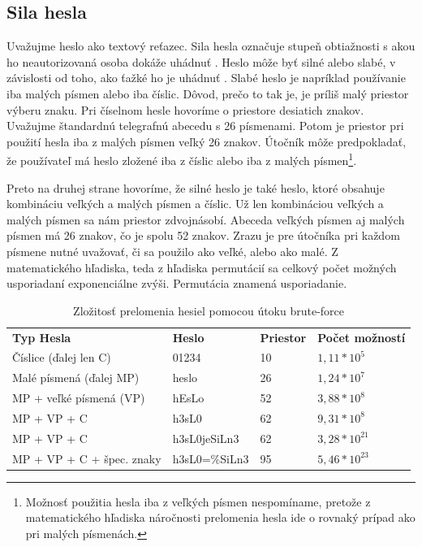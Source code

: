 \subsection{Sila hesla} 
Uvažujme heslo ako textový reťazec. Sila hesla označuje stupeň obtiažnosti s akou ho neautorizovaná osoba dokáže uhádnuť \cite{4}. Heslo môže byť silné alebo slabé, v závislosti od toho, ako ťažké ho je uhádnuť \cite{4}. Slabé heslo je napríklad používanie iba malých písmen alebo iba číslic. Dôvod, prečo to tak je, je príliš malý priestor výberu znaku. Pri číselnom hesle hovoríme o priestore desiatich znakov. Uvažujme štandardnú telegrafnú abecedu s 26 písmenami. Potom je priestor pri použití hesla iba z malých písmen veľký 26 znakov. Útočník môže predpokladať, že používateľ má heslo zložené iba z číslic alebo iba z malých písmen\footnote{Možnosť použitia hesla iba z veľkých písmen nespomíname, pretože z matematického hľadiska náročnosti prelomenia hesla ide o rovnaký prípad ako pri malých písmenách.}. \par Preto na druhej strane hovoríme, že silné heslo je také heslo, ktoré obsahuje kombináciu veľkých a malých písmen a číslic. Už len kombináciou veľkých a malých písmen sa nám priestor zdvojnásobí. Abeceda veľkých písmen aj malých písmen má 26 znakov, čo je spolu 52 znakov. Zrazu je pre útočníka pri každom písmene nutné uvažovať, či sa použilo ako veľké, alebo ako malé. Z matematického hľadiska, teda z hľadiska permutácií sa celkový počet možných usporiadaní exponenciálne zvýši. Permutácia znamená usporiadanie.  


\begin{table}[ht]
\caption{Zložitosť prelomenia hesiel pomocou útoku brute-force}
\label{table:1}
\begin{tabular}{llll}
\textbf{Typ Hesla}        & \textbf{Heslo} & \textbf{Priestor} & \textbf{Počet možností} \\
Číslice (ďalej len C)     & 01234          & 10                & $1,11*10^5$             \\
Malé písmená (ďalej MP)   & heslo          & 26                & $1,24*10^7$             \\
MP + veľké písmená (VP)   & hEsLo          & 52                & $3,88*10^8$             \\
MP + VP + C               & h3sL0          & 62                & $9,31*10^8$             \\
MP + VP + C				  & h3sL0jeSiLn3   & 62				   & $3,28*10^{21}$			 \\
MP + VP + C + špec. znaky & h3sL0=\%SiLn3  & 95                & $5,46*10^{23}$           
\end{tabular}
\end{table}

